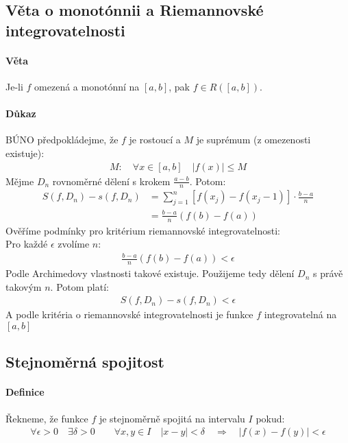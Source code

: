 \documentclass[a4paper,10pt]{article}
\begin{document}
\subsection{Věta o monotónnii a Riemannovské integrovatelnosti}
\setcounter{equation}{0}
\paragraph{Věta}
Je-li $f$ omezená a monotónní na $[a,b]$, pak $f \in R([a,b])$.
\paragraph{Důkaz}
BÚNO předpokládejme, že $f$ je rostoucí a $M$ je suprémum (z omezenosti existuje):
\begin{align}
	M: \quad \forall x \in [a,b] \quad |f(x)| \le M
\end{align}
Mějme $D_n$ rovnoměrné dělení s krokem $\frac{a-b}{n}$. Potom:
\begin{align}
	S(f, D_n) - s(f, D_n) &= \sum_{j=1}^n \left[ f(x_j) - f(x_j-1) \right] \cdot
	\frac{b-a}{n} \\
	&= \frac{b-a}{n}\left( f(b) - f(a) \right)
\end{align}
Ověříme podmínky pro kritérium riemannovské integrovatelnosti: \\
Pro každé $\epsilon$ zvolíme $n$:
\begin{align}
	\frac{b-a}{n} (f(b)-f(a)) < \epsilon
\end{align}
Podle Archimedovy vlastnosti takové existuje. Použijeme tedy dělení $D_n$ s právě
takovým $n$. Potom platí:
\begin{align}
	S(f, D_n) - s(f, D_n) < \epsilon
\end{align}
A podle kritéria o riemannovské integrovatelnosti je funkce $f$ integrovatelná na
$[a,b]$


\subsection{Stejnoměrná spojitost}
\setcounter{equation}{0}
\paragraph{Definice}
Řekneme, že funkce $f$ je stejnoměrně spojitá na intervalu $I$ pokud:
\begin{align*}
	\forall \epsilon > 0 \quad \exists \delta > 0 \qquad \forall x,y \in I \quad
	|x-y| < \delta \quad \Rightarrow \quad |f(x) - f(y)| < \epsilon
\end{align*}
\end{document}
